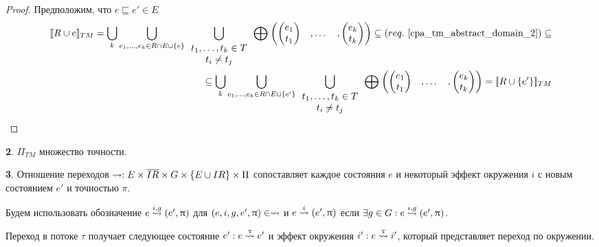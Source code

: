 \begin{proof}
Предположим, что $e \sqsubseteq e' \in E$
\begin{align}
[\![ R \cup e ]\!]_{TM} = \bigcup_{k}{\bigcup_{
e_1,\dots,e_k \in R \cap E \cup \{e\}}{
\bigcup_{
\begin{array}{c}
t_1,\dots,t_k \in T \\
t_i \neq t_j
\end{array}
} {
\mathrel{\bigoplus}
\begin{pmatrix}
\begin{pmatrix}
e_1 \\
t_1 
\end{pmatrix}&,
\dots& ,
\begin{pmatrix}
e_k \\
t_k 
\end{pmatrix}
\end{pmatrix} 
}
}
} \subseteq (req.~\ref{cpa_tm_abstract_domain_2}) \subseteq \nonumber \\
\subseteq \bigcup_{k}{\bigcup_{
e_1,\dots,e_k \in R \cap E \cup \{e'\}}{
\bigcup_{
\begin{array}{c}
t_1,\dots,t_k \in T \\
t_i \neq t_j
\end{array}
} {
\mathrel{\bigoplus}
\begin{pmatrix}
\begin{pmatrix}
e_1 \\
t_1 
\end{pmatrix}&,
\dots& ,
\begin{pmatrix}
e_k \\
t_k 
\end{pmatrix}
\end{pmatrix} 
}
}
} = [\![ R \cup \{e'\} ]\!]_{TM} \nonumber
\end{align}
\end{proof}

{\textbf 2.}
$\Pi_{TM}$ множество точности.

{\textbf 3.}
Отношение переходов
$\leadsto: E\times \overline{IR} \times G \times \{E\cup IR\} \times \Pi$
сопоставляет каждое состояния $e$ и некоторый эффект окружения $i$ с новым состоянием $e'$ и точностью $\pi$. 

Будем использовать обозначение $e \stackrel{i, g}{\leadsto} (e', \uppi)$ для $(e, i, g, e', \uppi) \in \leadsto$
и $e \stackrel{i}{\leadsto} (e', \uppi)$ если $\exists g \in G: e \stackrel{i, g}{\leadsto} (e', \uppi)$.

Переход в потоке $\tau$ получает следующее состояние $e': e \stackrel{\uptau}{\leadsto} e'$ и эффект окружения $i': e \stackrel{\uptau}{\leadsto} i'$, который представляет переход по окружении.

